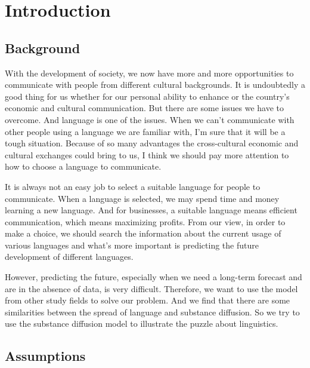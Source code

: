 \documentclass{mcmthesis}
\begin{document}
  \maketitle
  \tableofcontents

  \clearpage%
  \section{Introduction}%
    \subsection{Background}
    With the development of society, we now have more and more opportunities to communicate with people from different cultural backgrounds.
    It is undoubtedly a good thing for us whether for our personal ability to enhance or the country's economic and cultural communication.
    But there are some issues we have to overcome.
    And language is one of the issues.
    When we can't communicate with other people using a language we are familiar with,
    I'm sure that it will be a tough situation.
    Because of so many advantages the cross-cultural economic and cultural exchanges could bring to us,
    I think we should pay more attention to how to choose a language to communicate.

    It is always not an easy job to select a suitable language for people to communicate.
    When a language is selected, we may spend time and money learning a new language.
    And for businesses, a suitable language means efficient communication, which means maximizing profits.
    From our view, in order to make a choice,
    we should search the information about the current usage of various languages
    and what's more important is predicting the future development of different languages.

    However, predicting the future,
    especially when we need a long-term forecast and are in the absence of data,
    is very difficult.
    Therefore, we want to use the model from other study fields to solve our problem.
    And we find that there are some similarities between the spread of language and substance diffusion.
    So we try to use the substance diffusion model to illustrate the puzzle about linguistics.

    \subsection{Assumptions}%
\end{document}
